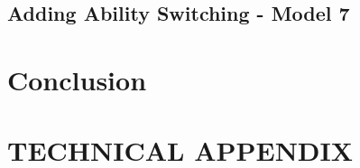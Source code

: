 \documentclass[letterpaper,12pt]{article}
\theoremstyle{definition}
\numberwithin{equation}{section}
\begin{document}
\begin{spacing}{1.5}
  \subsection{Adding Ability Switching - Model 7}\label{SubSec_Macro_Switch}

\section{Conclusion}\label{SecConclusion}


\end{spacing}


\newpage
\renewcommand{\theequation}{A.\arabic{section}.\arabic{equation}}
\renewcommand{\thedefinition}{A.\arabic{section}.\arabic{definition}}
\renewcommand{\thesection}{A-\arabic{section}}   %

\setcounter{equation}{0}                         %
\setcounter{section}{0}                          %
\section*{TECHNICAL APPENDIX}

\setcounter{definition}{0}
\setcounter{equation}{0}                         %




\newpage

\end{document}
